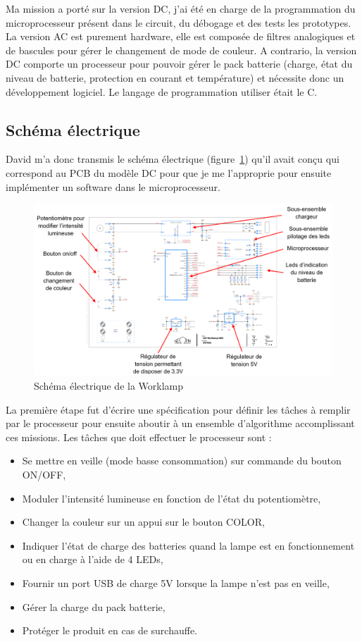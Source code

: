 \documentclass[a4paper, 12pt]{report}
\begin{document}
Ma mission a porté sur la version DC, j’ai été en charge de la programmation du microprocesseur présent dans le circuit, du débogage et des tests les prototypes. La version AC est purement hardware, elle est composée de filtres analogiques et de bascules pour gérer le changement de mode de couleur. A contrario, la version DC comporte un processeur pour pouvoir gérer le pack batterie (charge, état du niveau de batterie, protection en courant et température) et nécessite donc un développement logiciel. Le langage de programmation utiliser était le C.

\subsection{Schéma électrique}
David m’a donc transmis le schéma électrique (figure~\ref{fig:worklamp_schema}) qu’il avait conçu qui correspond au PCB du modèle DC pour que je me l’approprie pour ensuite implémenter un software dans le microprocesseur.

\begin{figure}[H]
\centering
\includegraphics[scale=0.51]{figures/screenshots/version_A3_worklamp.png}
\caption{Schéma électrique de la Worklamp}
\label{fig:worklamp_schema}
\end{figure}

La première étape fut d’écrire une spécification pour définir les tâches à remplir par le processeur pour ensuite aboutir à un ensemble d’algorithme accomplissant ces missions.
Les tâches que doit effectuer le processeur sont :
\begin{itemize} %
\item Se mettre en veille (mode basse consommation) sur commande du bouton ON/OFF,
\item Moduler l’intensité lumineuse en fonction de l’état du potentiomètre,
\item Changer la couleur sur un appui sur le bouton COLOR,
\item Indiquer l’état de charge des batteries quand la lampe est en fonctionnement ou en charge à l’aide de 4 LEDs,
\item Fournir un port USB de charge 5V lorsque la lampe n’est pas en veille,
\item Gérer la charge du pack batterie,
\item Protéger le produit en cas de surchauffe.
\end{itemize}
\end{document}
